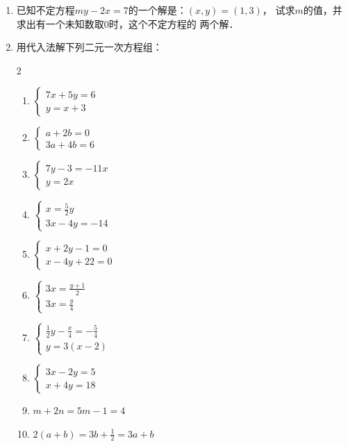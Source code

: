 \begin{enumerate}
\item 已知不定方程$my-2x=7$的一个解是：$(x,y)=(1,3)$，
试求$m$的值，并求出有一个未知数取0时，这个不定方程的
两个解．
\item 用代入法解下列二元一次方程组：
\begin{multicols}{2}
\begin{enumerate}
    \item $\begin{cases}
        7x+5y=6\\ y=x+3
    \end{cases}$
    \item $\begin{cases}
        a+2b=0\\ 3a+4b=6
    \end{cases}$
    \item $\begin{cases}
        7y-3=-11x\\ y=2x
    \end{cases}$
    \item $\begin{cases}
x=\frac{5}{2}y\\ 3x-4y=-14        
    \end{cases}$
    \item $\begin{cases}
        x+2y-1=0\\ x-4y+22=0
    \end{cases}$
    \item $\begin{cases}
        3x=\frac{y+1}{2}\\ 3x=\frac{y}{4}
    \end{cases}$
    \item $\begin{cases}
        \frac{1}{2}y-\frac{x}{4}=-\frac{5}{4}\\y=3(x-2)
    \end{cases}$
    \item $\begin{cases}
        3x-2y=5\\ x+4y=18
    \end{cases}$
    \item $m+2n=5m-1=4$
    \item $2(a+b)=3b+\frac{1}{2}=3a+b$
\end{enumerate}
\end{multicols}


\end{enumerate}
